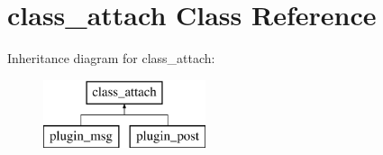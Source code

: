 \hypertarget{classclass__attach}{\section{class\-\_\-attach Class Reference}
\label{classclass__attach}
}
Inheritance diagram for class\-\_\-attach\-:\begin{figure}[H]
\begin{center}
\leavevmode
\includegraphics[height=2.000000cm]{classclass__attach}
\end{center}
\end{figure}
